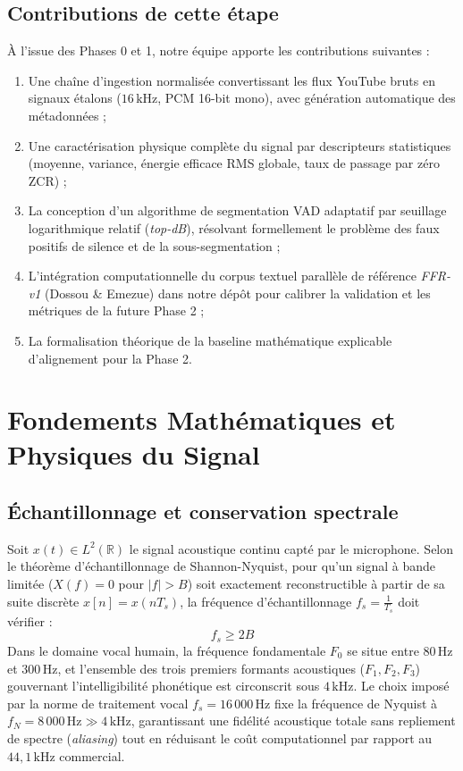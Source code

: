 \documentclass[10pt,a4paper,twocolumn]{article}
\begin{document}
\subsection{Contributions de cette étape}
À l'issue des Phases 0 et 1, notre équipe apporte les contributions suivantes :
\begin{enumerate}
    \item Une chaîne d'ingestion normalisée convertissant les flux YouTube bruts en signaux étalons ($16\,\text{kHz}$, PCM 16-bit mono), avec génération automatique des métadonnées ;
    \item Une caractérisation physique complète du signal par descripteurs statistiques (moyenne, variance, énergie efficace RMS globale, taux de passage par zéro ZCR) ;
    \item La conception d'un algorithme de segmentation VAD adaptatif par seuillage logarithmique relatif (\textit{top-dB}), résolvant formellement le problème des faux positifs de silence et de la sous-segmentation ;
    \item L'intégration computationnelle du corpus textuel parallèle de référence \textit{FFR-v1} (Dossou \& Emezue) dans notre dépôt pour calibrer la validation et les métriques de la future Phase 2 ;
    \item La formalisation théorique de la baseline mathématique explicable d'alignement pour la Phase 2.
\end{enumerate}

\section{Fondements Mathématiques et Physiques du Signal}

\subsection{Échantillonnage et conservation spectrale}
Soit $x(t) \in L^2(\mathbb{R})$ le signal acoustique continu capté par le microphone. Selon le théorème d'échantillonnage de Shannon-Nyquist, pour qu'un signal à bande limitée ($X(f) = 0$ pour $|f| > B$) soit exactement reconstructible à partir de sa suite discrète $x[n] = x(n T_s)$, la fréquence d'échantillonnage $f_s = \frac{1}{T_s}$ doit vérifier :
\begin{equation}
f_s \ge 2 B
\end{equation}
Dans le domaine vocal humain, la fréquence fondamentale $F_0$ se situe entre $80\,\text{Hz}$ et $300\,\text{Hz}$, et l'ensemble des trois premiers formants acoustiques ($F_1, F_2, F_3$) gouvernant l'intelligibilité phonétique est circonscrit sous $4\,\text{kHz}$. Le choix imposé par la norme de traitement vocal $f_s = 16\,000\,\text{Hz}$ fixe la fréquence de Nyquist à $f_N = 8\,000\,\text{Hz} \gg 4\,\text{kHz}$, garantissant une fidélité acoustique totale sans repliement de spectre (\textit{aliasing}) tout en réduisant le coût computationnel par rapport au $44{,}1\,\text{kHz}$ commercial.
\end{document}
